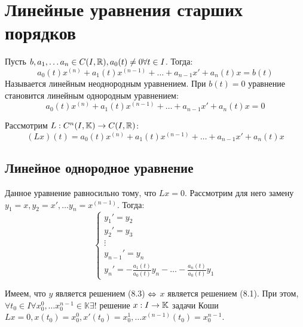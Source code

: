

\section{Линейные уравнения старших порядков}
\begin{definition}
    Пусть \(b, a_1, \dots a_n \in C(I, \mathbb{R}), a_0(t) \ne 0 \forall t \in I\). Тогда:
    \begin{equation}
        a_0(t)x^{(n)} + a_1(t)x^{(n - 1)} + \dots + a_{n - 1}x' + a_n(t)x = b(t)
    \end{equation}
    Называется линейным неоднородным уравнением. При \(b(t) = 0\) уравнение становится линейным однородным уравнением:
    \begin{equation}
        a_0(t)x^{(n)} + a_1(t)x^{(n - 1)} + \dots + a_{n - 1}x' + a_n(t)x = 0
    \end{equation}
\end{definition}

Рассмотрим \(L: C^n(I, \mathbb{K}) \rightarrow C(I, \mathbb{R})\):
\[(Lx)(t) = a_0(t)x^{(n)} + a_1(t)x^{(n - 1)} + \dots + a_{n - 1}x' + a_n(t)x\]

\subsection{Линейное однородное уравнение}
Данное уравнение равносильно тому, что \(Lx = 0\). Рассмотрим для него замену \(y_1 = x, y_2 = x', \dots y_n = x^{(n - 1)}\). Тогда:
\begin{equation}
    \begin{cases}
        y_1' = y_2 \\
        y_2' = y_3 \\
        \vdots \\
        y_{n - 1}' = y_n \\
        y_n' = -\frac{a_1(t)}{a_0(t)}y_n - \dots - \frac{a_n(t)}{a_0(t)}y_1
    \end{cases}
\end{equation}

Имеем, что \(y\) является решением (8.3) \(\Leftrightarrow\) \(x\) является решением (8.1). При этом, \(\forall t_0 \in I \forall x_0^0, \dots x_0^{n - 1} \in \mathbb{K} \exists!\) решение \(x: I \rightarrow \mathbb{K}\) задачи Коши \(Lx = 0, x(t_0) = x_0^0, x'(t_0) = x_0^1, \dots x^{(n - 1)}(t_0) = x_0^{n - 1}\).

